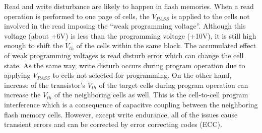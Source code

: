 Read and write disturbance are likely to happen in flash memories. When a read operation is performed to one page of cells, the $V_{PASS}$ is applied to the cells not involved in the read imposing the ``weak programming voltage''. Although this voltage (about +6V) is less than the programming voltage (+10V), it is still high enough to shift the $V_{th}$ of the cells within the same block. The accumulated effect of weak programming voltages is read disturb error which can change the cell state. As the same way, write disturb occurs during program operation due to applying $V_{PASS}$ to cells not selected for programming. On the other hand, increase of the transistor's $V_{th}$ of the target cells during program operation can increase the $V_{th}$ of the neighboring cells as well. This is the cell-to-cell program interference which is a consequence of capacitve coupling between the neighboring flash memory cells. However, except write endurance, all of the issues cause transient errors and can be corrected by error correcting codes (ECC).
